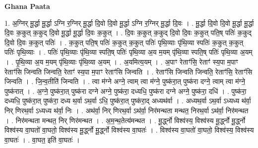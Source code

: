 \documentclass[17pt]{extarticle}
\begin{document}
\textbf{Ghana Paata } \newline

1. अ॒ग्निर् मू॒र्द्धा मू॒र्द्धा ऽग्नि र॒ग्निर् मू॒र्द्धा दि॒वो दि॒वो मू॒र्द्धा ऽग्नि र॒ग्निर् मू॒र्द्धा दि॒वः । . मू॒र्द्धा दि॒वो दि॒वो मू॒र्द्धा मू॒र्द्धा दि॒वः क॒कुत् क॒कुद् दि॒वो मू॒र्द्धा मू॒र्द्धा दि॒वः क॒कुत् । . दि॒वः क॒कुत् क॒कुद् दि॒वो दि॒वः क॒कुत् पति॒ष् पतिः॑ क॒कुद् दि॒वो दि॒वः क॒कुत् पतिः॑ । . क॒कुत् पति॒ष् पतिः॑ क॒कुत् क॒कुत् पतिः॑ पृथि॒व्याः पृ॑थि॒व्या स्पतिः॑ क॒कुत् क॒कुत् पतिः॑ पृथि॒व्याः । . पतिः॑ पृथि॒व्याः पृ॑थि॒व्या स्पति॒ष् पतिः॑ पृथि॒व्या अ॒य म॒यम् पृ॑थि॒व्या स्पति॒ष् पतिः॑ पृथि॒व्या अ॒यम् । . पृ॒थि॒व्या अ॒य म॒यम् पृ॑थि॒व्याः पृ॑थि॒व्या अ॒यम् । . अ॒यमित्य॒यम् । . अ॒पाꣳ रेताꣳ॑सि॒ रेताꣳ॑ स्य॒पा म॒पाꣳ रेताꣳ॑सि जिन्वति जिन्वति॒ रेताꣳ॑ स्य॒पा म॒पाꣳ रेताꣳ॑सि जिन्वति । . रेताꣳ॑सि जिन्वति जिन्वति॒ रेताꣳ॑सि॒ रेताꣳ॑सि जिन्वति । . जि॒न्व॒तीति॑ जिन्वति । . त्वा म॑ग्ने अग्ने॒ त्वाम् त्वा म॑ग्ने॒ पुष्क॑रा॒त् पुष्क॑रा दग्ने॒ त्वाम् त्वा म॑ग्ने॒ पुष्क॑रात् । . अ॒ग्ने॒ पुष्क॑रा॒त् पुष्क॑रा दग्ने अग्ने॒ पुष्क॑रा॒ दध्यधि॒ पुष्क॑रा दग्ने अग्ने॒ पुष्क॑रा॒ दधि॑ । . पुष्क॑रा॒ दध्यधि॒ पुष्क॑रा॒त् पुष्क॑रा॒ दध्य थ॒र्वा ऽथ॒र्वा ऽधि॒ पुष्क॑रा॒त् पुष्क॑रा॒द् अध्यथ॑र्वा । . अध्यथ॒र्वा ऽथ॒र्वा ऽध्यध्य थ॑र्वा॒ निर् णिरथ॒र्वा ऽध्यध्य थ॑र्वा॒ निः । . अथ॑र्वा॒ निर् णिरथ॒र्वा ऽथ॑र्वा॒ निर॑मन्थता मन्थत॒ निरथ॒र्वा ऽथ॑र्वा॒ निर॑मन्थत । . निर॑मन्थता मन्थत॒ निर् णिर॑मन्थत । . अ॒म॒न्थ॒तेत्य॑मन्थत । . मू॒र्द्ध्नो विश्व॑स्य॒ विश्व॑स्य मू॒र्द्ध्नो मू॒र्द्ध्नो विश्व॑स्य वा॒घतो॑ वा॒घतो॒ विश्व॑स्य मू॒र्द्ध्नो मू॒र्द्ध्नो विश्व॑स्य वा॒घतः॑ । . विश्व॑स्य वा॒घतो॑ वा॒घतो॒ विश्व॑स्य॒ विश्व॑स्य वा॒घतः॑ । . वा॒घत॒ इति॑ वा॒घतः॑ । \newline
\end{document}
